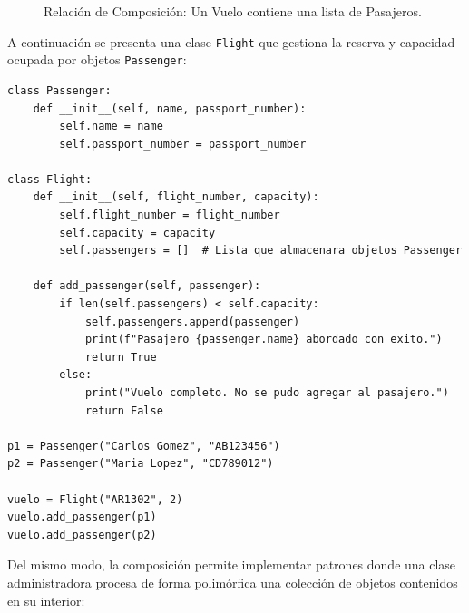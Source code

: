 \begin{figure}[!ht]
  \centering
  \caption{Relación de Composición: Un Vuelo contiene una lista de Pasajeros.}
  \label{fig:composicion_vuelo}
\end{figure}

A continuación se presenta una clase \texttt{Flight} que gestiona la reserva y capacidad ocupada por objetos \texttt{Passenger}:

\begin{lstlisting}[caption={Ejemplo de Composición con clases Flight y Passenger.}, label={list:composicion_flight}]
class Passenger:
    def __init__(self, name, passport_number):
        self.name = name
        self.passport_number = passport_number

class Flight:
    def __init__(self, flight_number, capacity):
        self.flight_number = flight_number
        self.capacity = capacity
        self.passengers = []  # Lista que almacenara objetos Passenger

    def add_passenger(self, passenger):
        if len(self.passengers) < self.capacity:
            self.passengers.append(passenger)
            print(f"Pasajero {passenger.name} abordado con exito.")
            return True
        else:
            print("Vuelo completo. No se pudo agregar al pasajero.")
            return False

p1 = Passenger("Carlos Gomez", "AB123456")
p2 = Passenger("Maria Lopez", "CD789012")

vuelo = Flight("AR1302", 2)
vuelo.add_passenger(p1)
vuelo.add_passenger(p2)
\end{lstlisting}

Del mismo modo, la composición permite implementar patrones donde una clase administradora procesa de forma polimórfica
una colección de objetos contenidos en su interior:


